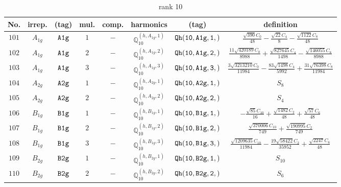 \documentclass[fleqn,8pt]{jsarticle}
\begin{document}
\begin{table}[ht!]
\begin{center}
\caption{rank 10}
\renewcommand{\arraystretch}{1.3}
\begin{tabular}{cccccccc} \hline \hline
No. & irrep. & (tag) & mul. & comp. & harmonics & (tag) & definition \\ \hline
$ 101 $ & $ A_{1g} $ & $ {\tt A1g} $ & $ 1 $ & $ - $ & $ \mathbb{Q}_{10}^{(h,A_{1g},1)} $ & $ {\tt Qh(10,A1g,1,)} $ & $ \frac{\sqrt{390} C_{0}}{48} - \frac{\sqrt{22} C_{4}}{8} - \frac{\sqrt{1122} C_{8}}{48} $ \\
$ 102 $ & $ A_{1g} $ & $ {\tt A1g} $ & $ 2 $ & $ - $ & $ \mathbb{Q}_{10}^{(h,A_{1g},2)} $ & $ {\tt Qh(10,A1g,2,)} $ & $ \frac{11 \sqrt{420189} C_{0}}{8988} + \frac{\sqrt{827645} C_{4}}{1498} - \frac{\sqrt{146055} C_{8}}{8988} $ \\
$ 103 $ & $ A_{1g} $ & $ {\tt A1g} $ & $ 3 $ & $ - $ & $ \mathbb{Q}_{10}^{(h,A_{1g},3)} $ & $ {\tt Qh(10,A1g,3,)} $ & $ \frac{3 \sqrt{3213210} C_{0}}{11984} - \frac{83 \sqrt{1498} C_{4}}{5992} + \frac{31 \sqrt{76398} C_{8}}{11984} $ \\
$ 104 $ & $ A_{2g} $ & $ {\tt A2g} $ & $ 1 $ & $ - $ & $ \mathbb{Q}_{10}^{(h,A_{2g},1)} $ & $ {\tt Qh(10,A2g,1,)} $ & $ S_{8} $ \\
$ 105 $ & $ A_{2g} $ & $ {\tt A2g} $ & $ 2 $ & $ - $ & $ \mathbb{Q}_{10}^{(h,A_{2g},2)} $ & $ {\tt Qh(10,A2g,2,)} $ & $ S_{4} $ \\
$ 106 $ & $ B_{1g} $ & $ {\tt B1g} $ & $ 1 $ & $ - $ & $ \mathbb{Q}_{10}^{(h,B_{1g},1)} $ & $ {\tt Qh(10,B1g,1,)} $ & $ - \frac{\sqrt{85} C_{10}}{16} + \frac{\sqrt{1482} C_{2}}{48} + \frac{\sqrt{57} C_{6}}{48} $ \\
$ 107 $ & $ B_{1g} $ & $ {\tt B1g} $ & $ 2 $ & $ - $ & $ \mathbb{Q}_{10}^{(h,B_{1g},2)} $ & $ {\tt Qh(10,B1g,2,)} $ & $ \frac{\sqrt{370006} C_{10}}{749} + \frac{\sqrt{190995} C_{2}}{749} $ \\
$ 108 $ & $ B_{1g} $ & $ {\tt B1g} $ & $ 3 $ & $ - $ & $ \mathbb{Q}_{10}^{(h,B_{1g},3)} $ & $ {\tt Qh(10,B1g,3,)} $ & $ \frac{\sqrt{1209635} C_{10}}{11984} - \frac{19 \sqrt{58422} C_{2}}{35952} + \frac{\sqrt{2247} C_{6}}{48} $ \\
$ 109 $ & $ B_{2g} $ & $ {\tt B2g} $ & $ 1 $ & $ - $ & $ \mathbb{Q}_{10}^{(h,B_{2g},1)} $ & $ {\tt Qh(10,B2g,1,)} $ & $ S_{10} $ \\
$ 110 $ & $ B_{2g} $ & $ {\tt B2g} $ & $ 2 $ & $ - $ & $ \mathbb{Q}_{10}^{(h,B_{2g},2)} $ & $ {\tt Qh(10,B2g,2,)} $ & $ S_{6} $ \\

\end{tabular}
\end{center}
\end{table}
\end{document}
